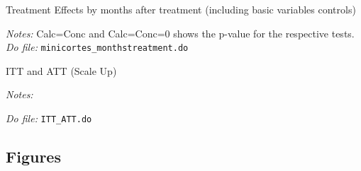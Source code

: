 \documentclass[11pt]{article}
\begin{document}
\begin{table}[H]
    \caption{Treatment Effects by months after treatment (including basic variables controls)}
    \label{Table_effects}
    \begin{center}
    \scriptsize{}
    \end{center}
    \footnotesize
    \textit{Notes:} 
    Calc=Conc and Calc=Conc=0 shows the p-value for the respective tests.
    \textit{Do file: } \texttt{minicortes\_monthstreatment.do}
\end{table}

\pagebreak


\begin{landscape}
\begin{table}[H]
    \caption{ITT and ATT (Scale Up)}
    \label{ITT_ATT}
    \begin{center}
    \scriptsize{}
    \end{center}
    \footnotesize
    \textit{Notes:} 
    
    \textit{Do file: } \texttt{ITT\_ATT.do}
\end{table}
\end{landscape}



\subsection{Figures}
\end{document}
